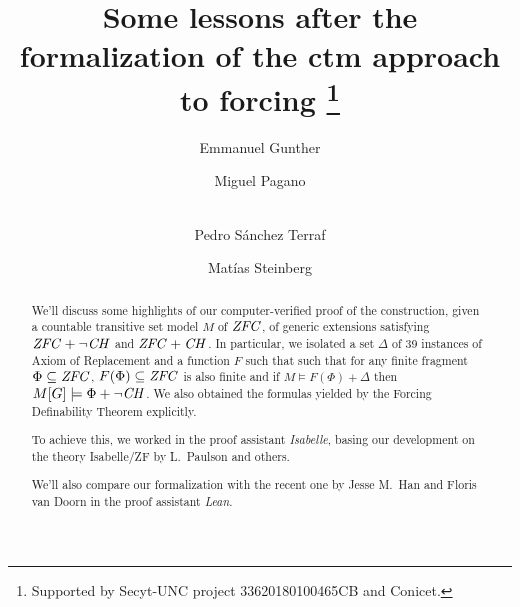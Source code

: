 \documentclass[runningheads]{llncs}
\begin{document}
%
\title{Some lessons after the formalization of the ctm approach to forcing%
  \thanks{Supported by Secyt-UNC project 33620180100465CB and Conicet.}%
}
%
%
\author{Emmanuel Gunther \and
Miguel Pagano \and \\
Pedro Sánchez Terraf%
\and
Matías Steinberg
}
%
%
%
\maketitle              %
%
\begin{abstract}
  We'll discuss some highlights of our computer-verified
  proof of the construction, given a countable transitive set model $M$
  of $\mathit{ZFC}$, of generic extensions  satisfying $\mathit{ZFC}+\neg\mathit{CH}$ and $\mathit{ZFC}+\mathit{CH}$.
  In particular,
  we isolated a set $\Delta$ of 39 instances
  of Axiom of Replacement and a function $F$
  such that such that for any finite fragment $\Phi\subseteq\mathit{ZFC}$,
  $F(\Phi)\subseteq\mathit{ZFC}$ is also finite and if
  $M\models F(\Phi) + \Delta$ then $M[G]\models \Phi + \neg \mathit{CH}$.
  We also obtained the formulas yielded by the Forcing Definability Theorem
  explicitly.

  To achieve this, we worked in the proof assistant \emph{Isabelle},
  basing our development on the theory Isabelle/ZF by L.~Paulson and
  others.


  We'll also compare our formalization with the recent one by Jesse
  M.~Han and Floris van Doorn in the proof assistant \emph{Lean}.

\end{abstract}
%
%
%


\end{document}
